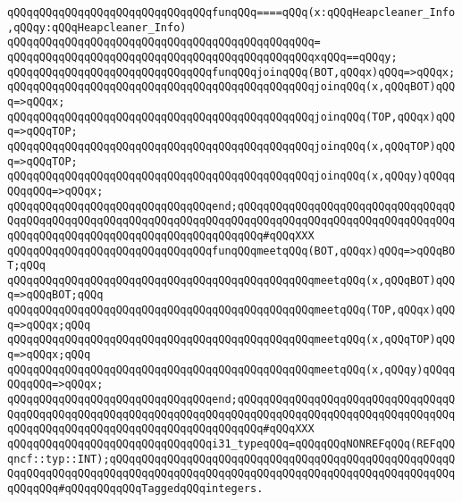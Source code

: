 \newline
\verb|qQQqqQQqqQQqqQQqqQQqqQQqqQQqqQQqfunqQQq====qQQq(x:qQQqHeapcleaner_Info,qQQqy:qQQqHeapcleaner_Info)|\newline
\verb|qQQqqQQqqQQqqQQqqQQqqQQqqQQqqQQqqQQqqQQqqQQqqQQq=|\newline
\verb|qQQqqQQqqQQqqQQqqQQqqQQqqQQqqQQqqQQqqQQqqQQqqQQqxqQQq==qQQqy;|\newline
\newline
\verb|qQQqqQQqqQQqqQQqqQQqqQQqqQQqqQQqfunqQQqjoinqQQq(BOT,qQQqx)qQQq=>qQQqx;|\newline
\verb|qQQqqQQqqQQqqQQqqQQqqQQqqQQqqQQqqQQqqQQqqQQqqQQqjoinqQQq(x,qQQqBOT)qQQq=>qQQqx;|\newline
\verb|qQQqqQQqqQQqqQQqqQQqqQQqqQQqqQQqqQQqqQQqqQQqqQQqjoinqQQq(TOP,qQQqx)qQQq=>qQQqTOP;|\newline
\verb|qQQqqQQqqQQqqQQqqQQqqQQqqQQqqQQqqQQqqQQqqQQqqQQqjoinqQQq(x,qQQqTOP)qQQq=>qQQqTOP;|\newline
\verb|qQQqqQQqqQQqqQQqqQQqqQQqqQQqqQQqqQQqqQQqqQQqqQQqjoinqQQq(x,qQQqy)qQQqqQQqqQQq=>qQQqx;|\newline
\verb|qQQqqQQqqQQqqQQqqQQqqQQqqQQqqQQqend;qQQqqQQqqQQqqQQqqQQqqQQqqQQqqQQqqQQqqQQqqQQqqQQqqQQqqQQqqQQqqQQqqQQqqQQqqQQqqQQqqQQqqQQqqQQqqQQqqQQqqQQqqQQqqQQqqQQqqQQqqQQqqQQqqQQqqQQqqQQqqQQq#qQQqXXX|\newline
\newline
\verb|qQQqqQQqqQQqqQQqqQQqqQQqqQQqqQQqfunqQQqmeetqQQq(BOT,qQQqx)qQQq=>qQQqBOT;qQQq|\newline
\verb|qQQqqQQqqQQqqQQqqQQqqQQqqQQqqQQqqQQqqQQqqQQqqQQqmeetqQQq(x,qQQqBOT)qQQq=>qQQqBOT;qQQq|\newline
\verb|qQQqqQQqqQQqqQQqqQQqqQQqqQQqqQQqqQQqqQQqqQQqqQQqmeetqQQq(TOP,qQQqx)qQQq=>qQQqx;qQQq|\newline
\verb|qQQqqQQqqQQqqQQqqQQqqQQqqQQqqQQqqQQqqQQqqQQqqQQqmeetqQQq(x,qQQqTOP)qQQq=>qQQqx;qQQq|\newline
\verb|qQQqqQQqqQQqqQQqqQQqqQQqqQQqqQQqqQQqqQQqqQQqqQQqmeetqQQq(x,qQQqy)qQQqqQQqqQQq=>qQQqx;|\newline
\verb|qQQqqQQqqQQqqQQqqQQqqQQqqQQqqQQqend;qQQqqQQqqQQqqQQqqQQqqQQqqQQqqQQqqQQqqQQqqQQqqQQqqQQqqQQqqQQqqQQqqQQqqQQqqQQqqQQqqQQqqQQqqQQqqQQqqQQqqQQqqQQqqQQqqQQqqQQqqQQqqQQqqQQqqQQqqQQqqQQq#qQQqXXX|\newline
\newline
\verb|qQQqqQQqqQQqqQQqqQQqqQQqqQQqqQQqi31_typeqQQq=qQQqqQQqNONREFqQQq(REFqQQqncf::typ::INT);qQQqqQQqqQQqqQQqqQQqqQQqqQQqqQQqqQQqqQQqqQQqqQQqqQQqqQQqqQQqqQQqqQQqqQQqqQQqqQQqqQQqqQQqqQQqqQQqqQQqqQQqqQQqqQQqqQQqqQQqqQQqqQQqqQQq#qQQqqQQqqQQqTaggedqQQqintegers.|\newline
